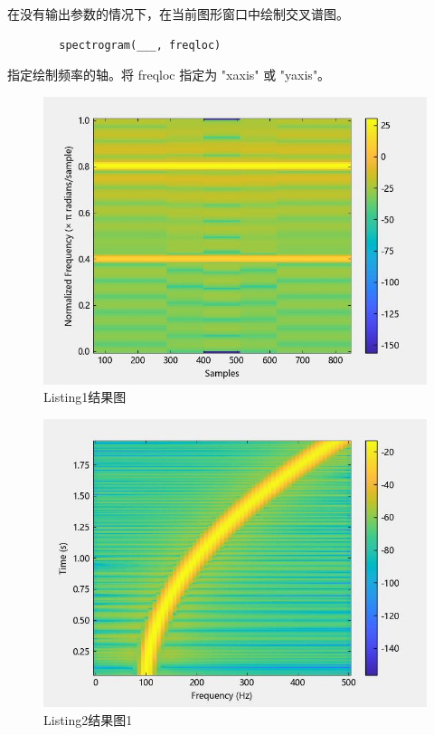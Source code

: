\documentclass{article}
\begin{document}
	在没有输出参数的情况下，在当前图形窗口中绘制交叉谱图。

	\begin{verbatim}
		spectrogram(___, freqloc) 
	\end{verbatim}

	指定绘制频率的轴。将 freqloc 指定为 "xaxis" 或 "yaxis"。

	
	\begin{figure}[H]
		\centering
		\includegraphics{hw5(1).jpeg}
		\caption{Listing1结果图}
		\label{fig1}
	\end{figure}
	
	\begin{figure}[htbp]
		\centering
		\includegraphics{hw5(2)-1.jpeg}
		\caption{Listing2结果图1}
		\label{fig2-1}
	\end{figure}
\end{document}
